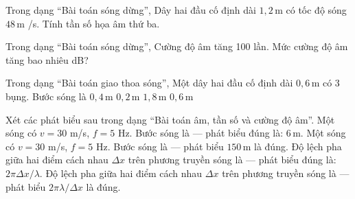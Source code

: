 \begin{bt}
Trong dạng “Bài toán sóng dừng”, Dây hai đầu cố định dài $1,2\,\text{m}$ có tốc độ sóng $48\,\text{m}$ /s. Tính tần số họa âm thứ ba.
\end{bt}

\begin{ex}
Trong dạng “Bài toán sóng dừng”, Cường độ âm tăng 100 lần. Mức cường độ âm tăng bao nhiêu dB?
\end{ex}

\begin{ex}
Trong dạng “Bài toán giao thoa sóng”, Một dây hai đầu cố định dài $0,6\,\text{m}$ có 3 bụng. Bước sóng là
\choice
{\True $0,4\,\text{m}$}
{$0,2\,\text{m}$}
{$1,8\,\text{m}$}
{$0,6\,\text{m}$}
\end{ex}

\begin{ex}
Xét các phát biểu sau trong dạng “Bài toán âm, tần số và cường độ âm”.
\choiceTF
{\True Một sóng có $v=30$ m/s, $f=5$ Hz. Bước sóng là — phát biểu đúng là: $6\,\text{m}$.}
{Một sóng có $v=30$ m/s, $f=5$ Hz. Bước sóng là — phát biểu $150\,\text{m}$ là đúng.}
{\True Độ lệch pha giữa hai điểm cách nhau $\Delta x$ trên phương truyền sóng là — phát biểu đúng là: $2\pi\Delta x/\lambda$.}
{Độ lệch pha giữa hai điểm cách nhau $\Delta x$ trên phương truyền sóng là — phát biểu $2\pi\lambda/\Delta x$ là đúng.}
\end{ex}

